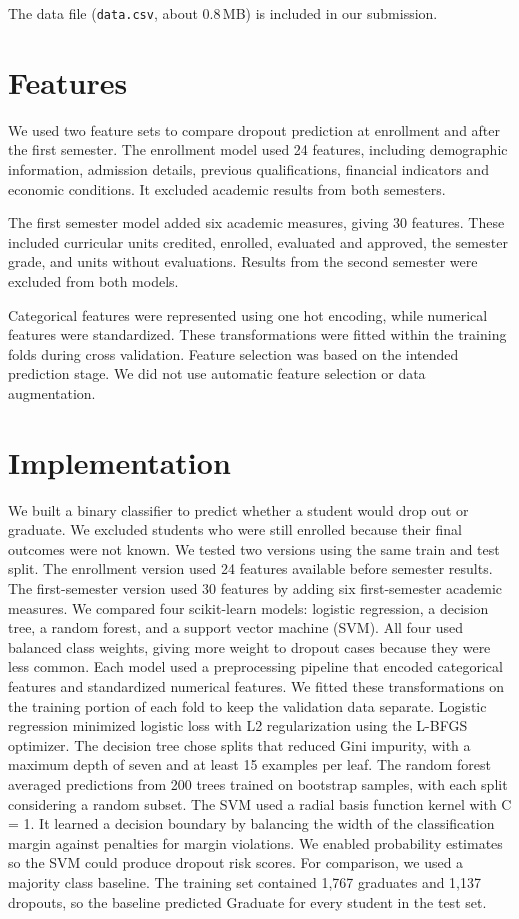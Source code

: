 \documentclass[11pt]{article}
\begin{document}
The data file (\texttt{data.csv}, about 0.8\,MB) is included in our submission.

\section{Features}\label{sec:features}

We used two feature sets to compare dropout prediction at enrollment and after the first semester. The enrollment model used 24 features, including demographic information, admission details, previous qualifications, financial indicators and economic conditions. It excluded academic results from both semesters.

The first semester model added six academic measures, giving 30 features. These included curricular units credited, enrolled, evaluated and approved, the semester grade, and units without evaluations. Results from the second semester were excluded from both models.

Categorical features were represented using one hot encoding, while numerical features were standardized. These transformations were fitted within the training folds during cross validation. Feature selection was based on the intended prediction stage. We did not use automatic feature selection or data augmentation.

\section{Implementation}\label{sec:implementation}

We built a binary classifier to predict whether a student would drop out or graduate. We excluded students who were still enrolled because their final outcomes were not known. We tested two versions using the same train and test split. The enrollment version used 24 features available before semester results. The first-semester version used 30 features by adding six first-semester academic measures.
We compared four scikit-learn models: logistic regression, a decision tree, a random forest, and a support vector machine (SVM). All four used balanced class weights, giving more weight to dropout cases because they were less common. Each model used a preprocessing pipeline that encoded categorical features and standardized numerical features. We fitted these transformations on the training portion of each fold to keep the validation data separate.
Logistic regression minimized logistic loss with L2 regularization using the L-BFGS optimizer. The decision tree chose splits that reduced Gini impurity, with a maximum depth of seven and at least 15 examples per leaf. The random forest averaged predictions from 200 trees trained on bootstrap samples, with each split considering a random subset. The SVM used a radial basis function kernel with C = 1. It learned a decision boundary by balancing the width of the classification margin against penalties for margin violations. We enabled probability estimates so the SVM could produce dropout risk scores.
For comparison, we used a majority class baseline. The training set contained 1,767 graduates and 1,137 dropouts, so the baseline predicted Graduate for every student in the test set.
\end{document}
